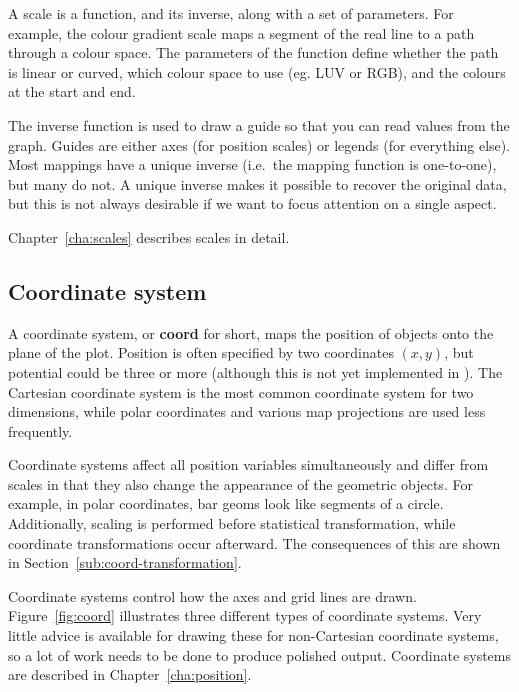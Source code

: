 A scale is a function, and its inverse, along with a set of parameters. For example, the colour gradient scale maps a segment of the real line to a path through a colour space. The parameters of the function define whether the path is linear or curved, which colour space to use (eg. LUV or RGB), and the colours at the start and end.

The inverse function is used to draw a guide so that you can read values from the graph.  Guides are either axes (for position scales) or legends (for everything else).  Most mappings have a unique inverse (i.e.\ the mapping function is one-to-one), but many do not.  A unique inverse makes it possible to recover the original data, but this is not always desirable if we want to focus attention on a single aspect.

Chapter~\ref{cha:scales} describes scales in detail.

\subsection{Coordinate system}\label{sec:coordinate_systems}

A coordinate system, or {\bf coord} for short, maps the position of objects onto the plane of the plot. Position is often specified by two coordinates $(x, y)$, but potential could be three or more (although this is not yet implemented in \ggplot). The Cartesian coordinate system is the most common coordinate system for two dimensions, while polar coordinates and various map projections are used less frequently.

Coordinate systems affect all position variables simultaneously and differ from scales in that they also change the appearance of the geometric objects. For example, in polar coordinates, bar geoms look like segments of a circle. Additionally, scaling is performed before statistical transformation, while coordinate transformations occur afterward. The consequences of this are shown in Section~\ref{sub:coord-transformation}.

Coordinate systems control how the axes and grid lines are drawn.  Figure~\ref{fig:coord} illustrates three different types of coordinate systems.  Very little advice is available for drawing these for non-Cartesian coordinate systems, so a lot of work needs to be done to produce polished output.  Coordinate systems are described in Chapter~\ref{cha:position}.

% 


